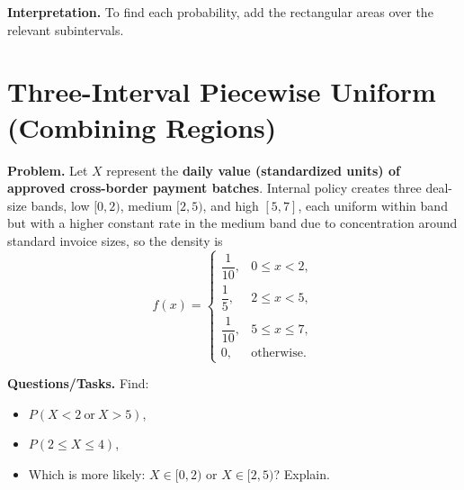 \begin{center}
\begin{minipage}{0.48\textwidth}
	\end{minipage}
\end{center}

\textbf{Interpretation.}
To find each probability, add the rectangular areas over the relevant subintervals.

\section{Three-Interval Piecewise Uniform (Combining Regions)}

\textbf{Problem.}
Let $X$ represent the \textbf{daily value (standardized units) of approved cross-border payment batches}. Internal policy creates three deal-size bands, low $[0,2)$, medium $[2,5)$, and high $[5,7]$, each uniform within band but with a higher constant rate in the medium band due to concentration around standard invoice sizes, so the density is
\[
f(x)=
\begin{cases}
\dfrac{1}{10}, & 0\le x<2,\\
\dfrac{1}{5}, & 2\le x<5,\\
\dfrac{1}{10}, & 5\le x\le 7,\\
0, & \text{otherwise.}
\end{cases}
\]

\textbf{Questions/Tasks.}
Find:
\begin{itemize}
    \item[(a)] $P(X<2\ \text{or}\ X>5)$,
    \item[(b)] $P(2\le X\le 4)$,
    \item[(c)] Which is more likely: $X\in[0,2)$ or $X\in[2,5)$? Explain.
\end{itemize}


